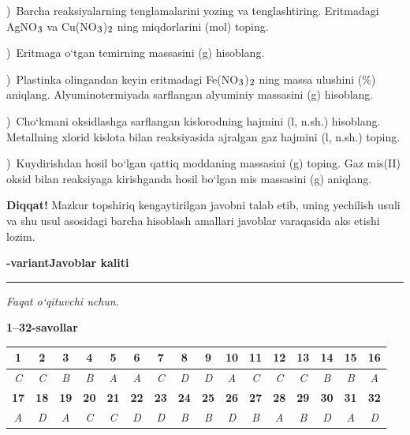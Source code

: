 \documentclass[11pt,a4paper]{article}
\renewcommand{\textsubscript}[1]{\ensuremath{_{\text{\fontsize{8}{8}\selectfont #1}}}}
\newcommand{\qsep}{\par\vspace{13pt}}
\newcommand{\diqqat}[1]{\par\smallskip\noindent\textbf{Diqqat!} #1\par\medskip}
\begin{document}
)\ Barcha reaksiyalarning tenglamalarini yozing va tenglashtiring. Eritmadagi AgNO\textsubscript{3} va Cu(NO\textsubscript{3})\textsubscript{2} ning miqdorlarini (mol) toping.\par
{})\ Eritmaga o`tgan temirning massasini (g) hisoblang.\par
{})\ Plastinka olingandan keyin eritmadagi Fe(NO\textsubscript{3})\textsubscript{2} ning massa ulushini (\%) aniqlang. Alyuminotermiyada sarflangan alyuminiy massasini (g) hisoblang.\par
{})\ Cho`kmani oksidlashga sarflangan kislorodning hajmini (l, n.sh.) hisoblang. Metallning xlorid kislota bilan reaksiyasida ajralgan gaz hajmini (l, n.sh.) toping.\par
{})\ Kuydirishdan hosil bo`lgan qattiq moddaning massasini (g) toping. Gaz mis(II) oksid bilan reaksiyaga kirishganda hosil bo`lgan mis massasini (g) aniqlang.\par
\diqqat{Mazkur topshiriq kengaytirilgan javobni talab etib, uning yechilish usuli va shu usul asosidagi barcha hisoblash amallari javoblar varaqasida aks etishi lozim.}\qsep
\newpage
\noindent\textbf{\fontsize{13}{15}-variant}\hfill \textbf{Javoblar kaliti}\par\smallskip\hrule\smallskip
\textit{Faqat o`qituvchi uchun.}\par\medskip
\noindent\textbf{1--32-savollar}\par\smallskip
\noindent\begin{tabular}{|c|c|c|c|c|c|c|c|c|c|c|c|c|c|c|c|}\hline
\textbf{1} & \textbf{2} & \textbf{3} & \textbf{4} & \textbf{5} & \textbf{6} & \textbf{7} & \textbf{8} & \textbf{9} & \textbf{10} & \textbf{11} & \textbf{12} & \textbf{13} & \textbf{14} & \textbf{15} & \textbf{16}\\\hline
\textsl{C} & \textsl{C} & \textsl{B} & \textsl{B} & \textsl{A} & \textsl{A} & \textsl{C} & \textsl{D} & \textsl{D} & \textsl{A} & \textsl{C} & \textsl{C} & \textsl{C} & \textsl{B} & \textsl{B} & \textsl{A}\\\hline
\textbf{17} & \textbf{18} & \textbf{19} & \textbf{20} & \textbf{21} & \textbf{22} & \textbf{23} & \textbf{24} & \textbf{25} & \textbf{26} & \textbf{27} & \textbf{28} & \textbf{29} & \textbf{30} & \textbf{31} & \textbf{32}\\\hline
\textsl{A} & \textsl{D} & \textsl{A} & \textsl{C} & \textsl{C} & \textsl{D} & \textsl{D} & \textsl{B} & \textsl{B} & \textsl{D} & \textsl{B} & \textsl{A} & \textsl{B} & \textsl{D} & \textsl{A} & \textsl{D}\\\hline
\end{tabular}\par\medskip
\end{document}
